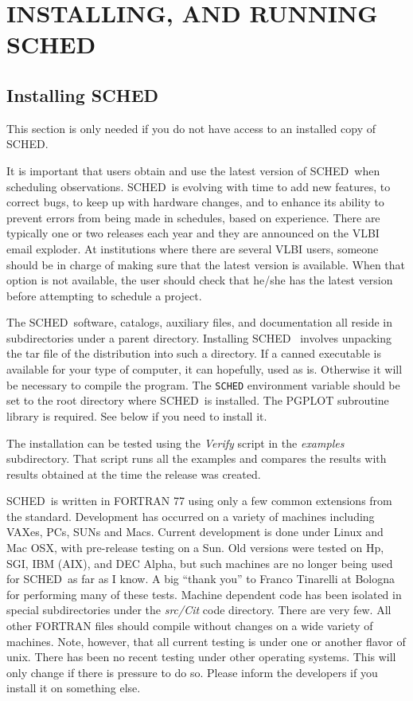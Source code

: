\documentclass{report}
\newcommand{\sched}{{\sc SCHED}}
\newcommand{\schedb}{{\sc SCHED~}}
\begin{document}
\chapter{\label{CHP:SYSTEM}INSTALLING, AND RUNNING SCHED}

\section{\label{SEC:INSTALL}Installing SCHED}

This section is only needed if you do not have access to an installed
copy of \sched.

It is important that users obtain and use the latest version of
\schedb when scheduling observations.  \schedb is evolving with time
to add new features, to correct bugs, to keep up with hardware
changes, and to enhance its ability to prevent errors from being made
in schedules, based on experience.  There are typically one or two
releases each year and they are announced on the VLBI email exploder.
At institutions where there are several VLBI users, someone should be
in charge of making sure that the latest version is available.  When
that option is not available, the user should check that he/she has
the latest version before attempting to schedule a project.

The \schedb software, catalogs, auxiliary files, and documentation all
reside in subdirectories under a parent directory.  Installing \schedb
involves unpacking the tar file of the distribution into such a
directory.  If a canned executable is available for your type of
computer, it can hopefully, used as is.  Otherwise it will be
necessary to compile the program.  The {\tt SCHED} environment variable
should be set to the root directory where \schedb is installed.
The {\sc PGPLOT} subroutine library is required.  See below if you need
to install it.

The installation can be tested using the {\sl Verify} script in the
{\sl examples} subdirectory.  That script runs all the examples and
compares the results with results obtained at the time the release was
created.

\schedb is written in FORTRAN 77 using only a few common extensions
from the standard.  Development has occurred on a variety of machines
including VAXes, PCs, SUNs and Macs.  Current development is done
under Linux and Mac OSX, with pre-release testing on a Sun.  Old
versions were tested on Hp, SGI, IBM (AIX), and DEC Alpha, but such
machines are no longer being used for \schedb as far as I know.  A big
``thank you'' to Franco Tinarelli at Bologna for performing many of
these tests.  Machine dependent code has been isolated in special
subdirectories under the {\sl src/Cit} code directory.  There are very
few.  All other FORTRAN files should compile without changes on a wide
variety of machines.  Note, however, that all current testing is under
one or another flavor of unix.  There has been no recent testing under
other operating systems.  This will only change if there is pressure
to do so.  Please inform the developers if you install it on something
else.
\end{document}
